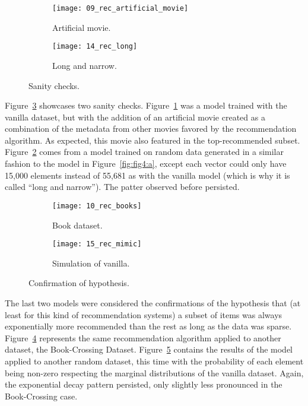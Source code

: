 \begin{figure}
  \centering
  \begin{subfigure}{0.45\textwidth}
    \centering
    \texttt{[image: 09\_rec\_artificial\_movie]}
    \caption{Artificial movie.\label{fig:fig5:a}}
  \end{subfigure}
  \begin{subfigure}{0.45\textwidth}
    \centering
    \texttt{[image: 14\_rec\_long]}
    \caption{Long and narrow.\label{fig:fig5:b}}
  \end{subfigure}
  \caption{Sanity checks.\label{fig:fig5}}
\end{figure}

Figure~\ref{fig:fig5} showcases two sanity checks. Figure~\ref{fig:fig5:a} was a
model trained with the vanilla dataset, but with the addition of an artificial
movie created as a combination of the metadata from other movies favored by the
recommendation algorithm. As expected, this movie also featured in the
top-recommended subset. Figure~\ref{fig:fig5:b} comes from a model trained on
random data generated in a similar fashion to the model in
Figure~\ref{fig:fig4:a}, except each vector could only have 15,000 elements
instead of 55,681 as with the vanilla model (which is why it is called ``long
and narrow''). The patter observed before persisted.

\begin{figure}
  \centering
  \begin{subfigure}{0.45\textwidth}
    \centering
    \texttt{[image: 10\_rec\_books]}
    \caption{Book dataset.\label{fig:fig6:a}}
  \end{subfigure}
  \begin{subfigure}{0.45\textwidth}
    \centering
    \texttt{[image: 15\_rec\_mimic]}
    \caption{Simulation of vanilla.\label{fig:fig6:b}}
  \end{subfigure}
  \caption{Confirmation of hypothesis.\label{fig:fig6}}
\end{figure}

The last two models were considered the confirmations of the hypothesis that
(at least for this kind of recommendation systems) a subset of items was always
exponentially more recommended than the rest as long as the data was sparse.
Figure~\ref{fig:fig6:a} represents the same recommendation algorithm applied to
another dataset, the Book-Crossing Dataset. Figure~\ref{fig:fig6:b} contains the
results of the model applied to another random dataset, this time with the
probability of each element being non-zero respecting the marginal distributions
of the vanilla dataset. Again, the exponential decay pattern persisted, only
slightly less pronounced in the Book-Crossing case.

